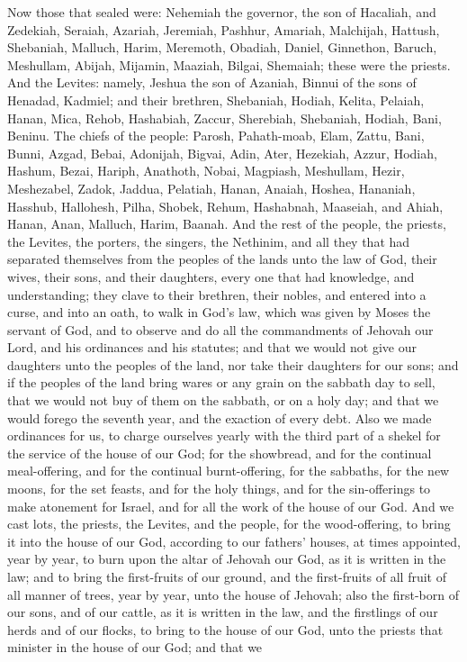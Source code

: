 Now those that sealed were: Nehemiah the governor, the son of Hacaliah, and Zedekiah, Seraiah, Azariah, Jeremiah, Pashhur, Amariah, Malchijah, Hattush, Shebaniah, Malluch, Harim, Meremoth, Obadiah, Daniel, Ginnethon, Baruch, Meshullam, Abijah, Mijamin, Maaziah, Bilgai, Shemaiah; these were the priests. And the Levites: namely, Jeshua the son of Azaniah, Binnui of the sons of Henadad, Kadmiel; and their brethren, Shebaniah, Hodiah, Kelita, Pelaiah, Hanan, Mica, Rehob, Hashabiah, Zaccur, Sherebiah, Shebaniah, Hodiah, Bani, Beninu. The chiefs of the people: Parosh, Pahath-moab, Elam, Zattu, Bani, Bunni, Azgad, Bebai, Adonijah, Bigvai, Adin, Ater, Hezekiah, Azzur, Hodiah, Hashum, Bezai, Hariph, Anathoth, Nobai, Magpiash, Meshullam, Hezir, Meshezabel, Zadok, Jaddua, Pelatiah, Hanan, Anaiah, Hoshea, Hananiah, Hasshub, Hallohesh, Pilha, Shobek, Rehum, Hashabnah, Maaseiah, and Ahiah, Hanan, Anan, Malluch, Harim, Baanah.  And the rest of the people, the priests, the Levites, the porters, the singers, the Nethinim, and all they that had separated themselves from the peoples of the lands unto the law of God, their wives, their sons, and their daughters, every one that had knowledge, and understanding; they clave to their brethren, their nobles, and entered into a curse, and into an oath, to walk in God’s law, which was given by Moses the servant of God, and to observe and do all the commandments of Jehovah our Lord, and his ordinances and his statutes; and that we would not give our daughters unto the peoples of the land, nor take their daughters for our sons; and if the peoples of the land bring wares or any grain on the sabbath day to sell, that we would not buy of them on the sabbath, or on a holy day; and that we would forego the seventh year, and the exaction of every debt.  Also we made ordinances for us, to charge ourselves yearly with the third part of a shekel for the service of the house of our God; for the showbread, and for the continual meal-offering, and for the continual burnt-offering, for the sabbaths, for the new moons, for the set feasts, and for the holy things, and for the sin-offerings to make atonement for Israel, and for all the work of the house of our God. And we cast lots, the priests, the Levites, and the people, for the wood-offering, to bring it into the house of our God, according to our fathers’ houses, at times appointed, year by year, to burn upon the altar of Jehovah our God, as it is written in the law; and to bring the first-fruits of our ground, and the first-fruits of all fruit of all manner of trees, year by year, unto the house of Jehovah; also the first-born of our sons, and of our cattle, as it is written in the law, and the firstlings of our herds and of our flocks, to bring to the house of our God, unto the priests that minister in the house of our God; and that we 